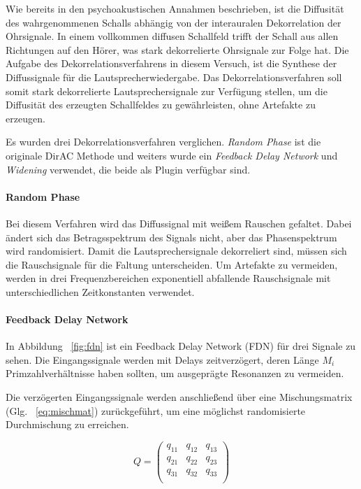 Wie bereits in den psychoakustischen Annahmen beschrieben, ist die Diffusität des wahrgenommenen Schalls abhängig von der interauralen Dekorrelation der Ohrsignale. In einem vollkommen diffusen Schallfeld trifft der Schall aus allen Richtungen auf den Hörer, was stark dekorrelierte Ohrsignale zur Folge hat. Die Aufgabe des Dekorrelationsverfahrens in diesem Versuch, ist die Synthese der Diffussignale für die Lautsprecherwiedergabe. Das Dekorrelationsverfahren soll somit stark dekorrelierte Lautsprechersignale zur Verfügung stellen, um die Diffusität des erzeugten Schallfeldes zu gewährleisten, ohne Artefakte zu erzeugen.

Es wurden drei Dekorrelationsverfahren verglichen. \textit{Random Phase} ist die originale DirAC Methode und weiters wurde ein \textit{Feedback Delay Network} und \textit{Widening} verwendet, die beide als Plugin verfügbar sind.

\paragraph{Random Phase}
\label{randphas}
Bei diesem Verfahren wird das Diffussignal mit weißem Rauschen gefaltet. Dabei ändert sich das Betragsspektrum des Signals nicht, aber das Phasenspektrum wird randomisiert. Damit die Lautsprechersignale dekorreliert sind, müssen sich die Rauschsignale für die Faltung unterscheiden. Um Artefakte zu vermeiden, werden in drei Frequenzbereichen exponentiell abfallende Rauschsignale mit unterschiedlichen Zeitkonstanten verwendet.

\paragraph{Feedback Delay Network}

In Abbildung ~\ref{fig:fdn} ist ein Feedback Delay Network (FDN) für drei Signale zu sehen. Die Eingangssignale werden mit Delays zeitverzögert, deren Länge $M_i$ Primzahlverhältnisse haben sollten, um ausgeprägte Resonanzen zu vermeiden.

Die verzögerten Eingangssignale werden anschließend über eine Mischungsmatrix (Glg. ~\ref{eq:mischmat}) zurückgeführt, um eine möglichst randomisierte Durchmischung zu erreichen.

\begin{equation}
    Q = 
    \begin{pmatrix}
		q_{11} & q_{12} & q_{13} \\
        q_{21} & q_{22} & q_{23} \\
        q_{31} & q_{32} & q_{33} \\
    \end{pmatrix}
    \label{eq:mischmat}
\end{equation}


